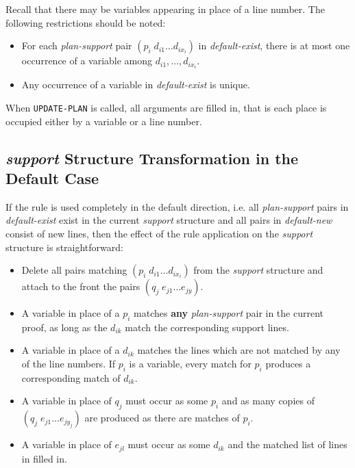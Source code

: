 Recall that there may be variables appearing in place of a line number.
The following restrictions should be noted:

\begin{itemize}
\item For each {\it plan-support} pair
$(p_i\; d_{i1} \ldots  d_{ix_i})$ in {\it default-exist}, there is at most one
occurrence of a variable among $d_{i1},\ldots,d_{ix_i}$.

\item Any occurrence of a variable in {\it default-exist} is unique.
\end{itemize}

When {\tt UPDATE-PLAN} is called, all arguments are filled in, that is each
place is occupied either by a variable or a line number.

\subsection{{\it support} Structure Transformation in the Default Case}

If the rule is used completely in the default direction, i.e. all
{\it plan-support} pairs in {\it default-exist} exist in the current
{\it support} structure and all pairs in {\it default-new} consist of new lines,
then the effect of the rule application on the {\it support} structure is
straightforward:

\begin{itemize}
\item Delete all pairs matching $(p_i\; d_{i1}\ldots d_{ix_i})$ from the
{\it support} structure and attach to the front the pairs 
$(q_j\; e_{j1} \ldots e_{jy})$.

\item A variable in place of a $p_i$ matches {\bf any} {\it plan-support} pair in the
current proof, as long as the $d_{ik}$ match the corresponding support
lines.

\item A variable in place of a $d_{ik}$ matches the lines which are not matched by
any of the line numbers.  If $p_i$ is a variable, every match for $p_i$
produces a corresponding match of $d_{ik}$.

\item A variable in place of $q_j$ must occur as some $p_i$ and as many copies
of $(q_j\; e_{j1}\ldots e_{jy_j})$
are produced as there are matches of $p_i$.

\item A variable in place of $e_{jl}$ must occur as some $d_{ik}$ and the matched
list of lines in filled in.
\end{itemize}

